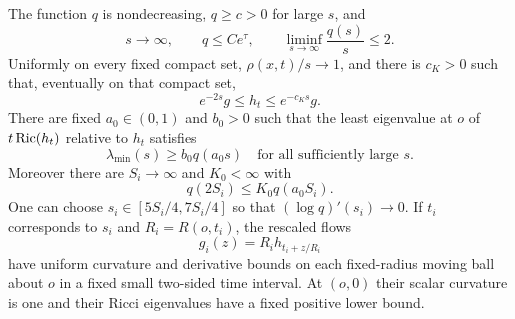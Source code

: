 \begin{proposition}\label{prop:ricci-windows}
The function $q$ is nondecreasing, $q\ge c>0$ for large $s$, and
\begin{equation}\label{chart:q-growth}
 s\longrightarrow\infty,\qquad
 q\le Ce^\tau,\qquad
 \liminf_{s\to\infty}\frac{q(s)}s\le2.
\end{equation}
Uniformly on every fixed compact set, $\rho(x,t)/s\to1$, and
there is $c_K>0$ such that, eventually on that compact set,
\begin{equation}\label{chart:metric-decay}
 e^{-2s}g\le h_t\le e^{-c_Ks}g.
\end{equation}
There are fixed $a_0\in(0,1)$ and $b_0>0$ such that the least
eigenvalue at $o$ of $t\operatorname{Ric}(h_t)$ relative to $h_t$ satisfies
\begin{equation}\label{chart:ricci-lower}
 \lambda_{\min}(s)\ge b_0q(a_0s)
 \quad\text{for all sufficiently large }s.
\end{equation}
Moreover there are $S_i\to\infty$ and $K_0<\infty$ with
\begin{equation}\label{chart:good-windows}
 q(2S_i)\le K_0q(a_0S_i).
\end{equation}
One can choose $s_i\in[5S_i/4,7S_i/4]$ so that
$(\log q)'(s_i)\to0$.  If $t_i$ corresponds to $s_i$ and
$R_i=R(o,t_i)$, the rescaled flows
\begin{equation}\label{chart:rescaled-flows}
 g_i(z)=R_i h_{t_i+z/R_i}
\end{equation}
have uniform curvature and derivative bounds on each fixed-radius
moving ball about $o$ in a fixed small two-sided time interval.
At $(o,0)$ their scalar curvature is one and their Ricci
eigenvalues have a fixed positive lower bound.
\end{proposition}

